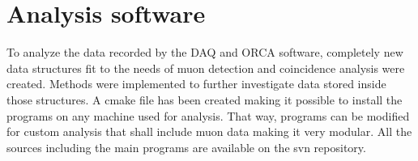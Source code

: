
\chapter{Analysis software}
\label{ch:Analysis software}
  To analyze the data recorded by the DAQ and ORCA software, completely new data structures fit to the needs of muon detection and coincidence analysis were created. 
  Methods were implemented to further investigate data stored inside those structures.
  A cmake file has been created making it possible to install the programs on any machine used for analysis. That way, programs can be modified for custom analysis that shall include muon data making it very modular. 
  All the sources including the main programs are available on the svn repository.
  
